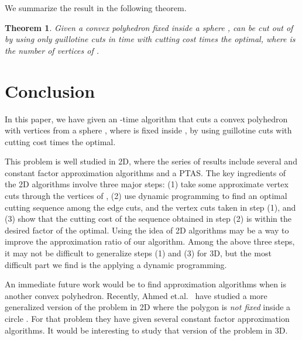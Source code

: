 \documentclass{llncs}
\newtheorem{thm}{Theorem}
\begin{document}
We summarize the result in the following theorem.

\begin{thm}
Given a convex polyhedron  fixed inside a sphere ,  can be cut out of  by using only
guillotine cuts in  time with cutting cost  times the optimal,
where  is the number of vertices of .
\end{thm}


\section{Conclusion}
\label{se:con}
In this paper, we have given an -time algorithm that cuts a convex polyhedron 
with  vertices from a sphere , where  is fixed inside , by using guillotine cuts
with cutting cost  times the optimal.


This problem is well studied in 2D, where the series of results include several  
and constant factor approximation algorithms and a PTAS.
The key ingredients of the 2D algorithms involve three major steps: 
(1) take some approximate vertex cuts through the vertices of , 
(2) use dynamic programming to find an optimal cutting sequence among the edge cuts,
and the vertex cuts taken in step (1), and 
(3) show that the cutting cost of the sequence obtained in step (2)
is within the desired factor of the optimal.
Using the idea of 2D algorithms may be a way to improve the approximation ratio of our algorithm.
Among the above three steps, it may not be difficult to generalize steps (1) and (3) for 3D,
but the most difficult part we find is the applying a dynamic programming.

An immediate future work would be to find approximation algorithms when  is another convex polyhedron.
Recently, Ahmed et.al.~\cite{ABHK10} have studied a more generalized version of the problem in 2D
where the polygon  is \emph{not fixed} inside a circle .
For that problem they have given several constant factor approximation algorithms. 
It would be interesting to study that version of the problem in 3D.







\end{document}
